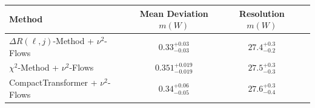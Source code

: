     \begin{tabular}{lccc}
        \toprule
        Method & Mean Deviation $m(W)$ & Resolution $m(W)$ \\
        \midrule
        $\Delta R(\ell,j)$-Method + $\nu^2$-Flows & $0.33^{+0.03}_{-0.03}$ & $27.4^{+0.3}_{-0.2}$ \\
        $\chi^2$-Method + $\nu^2$-Flows & $0.351^{+0.019}_{-0.019}$ & $27.5^{+0.3}_{-0.3}$ \\
        CompactTransformer + $\nu^2$-Flows & $0.34^{+0.06}_{-0.05}$ & $27.6^{+0.3}_{-0.4}$ \\
        \bottomrule
    \end{tabular}